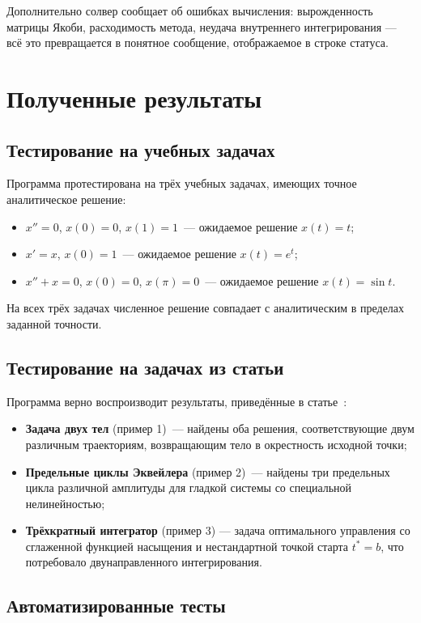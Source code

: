 \documentclass[12pt]{article}
\begin{document}
Дополнительно солвер сообщает об ошибках вычисления: вырожденность матрицы Якоби, расходимость метода, неудача внутреннего интегрирования --- всё это превращается в понятное сообщение, отображаемое в строке статуса.

\section{Полученные результаты}

\subsection{Тестирование на учебных задачах}

Программа протестирована на трёх учебных задачах, имеющих точное аналитическое решение:
\begin{itemize}
  \item $x'' = 0$, $x(0) = 0$, $x(1) = 1$~--- ожидаемое решение $x(t) = t$;
  \item $x' = x$, $x(0) = 1$~--- ожидаемое решение $x(t) = e^t$;
  \item $x'' + x = 0$, $x(0) = 0$, $x(\pi) = 0$~--- ожидаемое решение $x(t) = \sin t$.
\end{itemize}
На всех трёх задачах численное решение совпадает с аналитическим в пределах заданной точности.

\subsection{Тестирование на задачах из статьи}

Программа верно воспроизводит результаты, приведённые в статье~\cite{avvakumov-kiselev-2006}:
\begin{itemize}
  \item \textbf{Задача двух тел} (пример 1)~--- найдены оба решения, соответствующие двум различным траекториям, возвращающим тело в окрестность исходной точки;
  \item \textbf{Предельные циклы Эквейлера} (пример 2)~--- найдены три предельных цикла различной амплитуды для гладкой системы со специальной нелинейностью;
  \item \textbf{Трёхкратный интегратор} (пример 3) --- задача оптимального управления со сглаженной функцией насыщения и нестандартной точкой старта $t^* = b$, что потребовало двунаправленного интегрирования.
\end{itemize}

\subsection{Автоматизированные тесты}
\end{document}
